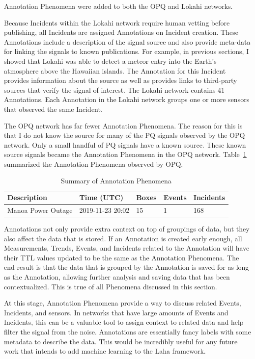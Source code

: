 Annotation Phenomena were added to both the OPQ and Lokahi networks.

Because Incidents within the Lokahi network require human vetting before publishing, all Incidents are assigned Annotations on Incident creation. These Annotations include a description of the signal source and also provide meta-data for linking the signals to known publications. For example, in previous sections, I showed that Lokahi was able to detect a meteor entry into the Earth's atmosphere above the Hawaiian islands. The Annotation for this Incident provides information about the source as well as provides links to third-party sources that verify the signal of interest. The Lokahi network contains 41 Annotations. Each Annotation in the Lokahi network groups one or more sensors that observed the same Incident.

The OPQ network has far fewer Annotation Phenomena. The reason for this is that I do not know the source for many of the PQ signals observed by the OPQ network. Only a small handful of PQ signals have a known source. These known source signals became the Annotation Phenomena in the OPQ network. Table~\ref{table:annotation_summary} summarized the Annotation Phenomena observed by OPQ.

\begin{table}[H]
    \centering
    \caption{Summary of Annotation Phenomena}
    \begin{tabularx}{\textwidth}{lllll}
        \toprule
        \textbf{Description} & \textbf{Time (UTC)} & \textbf{Boxes} & \textbf{Events} & \textbf{Incidents}  \\
        \midrule
        Manoa Power Outage & 2019-11-23 20:02 & 15 & 1 & 168 \\
        \bottomrule
    \end{tabularx}
    \label{table:annotation_summary}
\end{table}

Annotations not only provide extra context on top of groupings of data, but they also affect the data that is stored. If an Annotation is created early enough, all Measurements, Trends, Events, and Incidents related to the Annotation will have their TTL values updated to be the same as the Annotation Phenomena. The end result is that the data that is grouped by the Annotation is saved for as long as the Annotation, allowing further analysis and saving data that has been contextualized. This is true of all Phenomena discussed in this section.

At this stage, Annotation Phenomena provide a way to discuss related Events, Incidents, and sensors. In networks that have large amounts of Events and Incidents, this can be a valuable tool to assign context to related data and help filter the signal from the noise. Annotations are essentially fancy labels with some metadata to describe the data. This would be incredibly useful for any future work that intends to add machine learning to the Laha framework.

